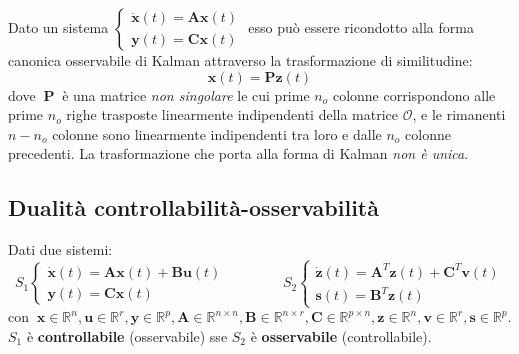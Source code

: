\documentclass[a4paper]{article}
\newcommand{\numberset}{\mathbb}
\newcommand{\R}{\numberset{R}}
\renewcommand{\vec}{\bm}
\theoremstyle{definition}
\begin{document}
			\noindent
			Dato un sistema $ \begin{cases}
			\dot{\vec{x}}(t) = \vec{A}\vec{x}(t) \\
			\vec{y}(t) = \vec{C}\vec{x}(t)
			\end{cases} $ esso può essere ricondotto alla forma canonica osservabile di Kalman attraverso la trasformazione di similitudine:
			\[
			\vec{x}(t) = \vec{P}\vec{z}(t)
			\]
			dove $\ \vec{P}\ $ è una matrice \textit{non singolare} le cui prime $ n_o $ colonne corrispondono alle prime $ n_o $ righe trasposte linearmente indipendenti della matrice $ \mathcal{O} $, e le rimanenti $ n - n_o $ colonne sono linearmente indipendenti tra loro e dalle $ n_o $ colonne precedenti. La trasformazione che porta alla forma di Kalman \textit{non è unica}. 
			
	\subsection{Dualità controllabilità-osservabilità}
		Dati due sistemi:
		\[
			S_1
			\begin{cases}
				\dot{\vec{x}}(t) = \vec{A}\vec{x}(t) + \vec{B}\vec{u}(t) \\
				\vec{y}(t) = \vec{C}\vec{x}(t)
			\end{cases}
			\qquad\qquad
			S_2
			\begin{cases}
				\dot{\vec{z}}(t) = \vec{A}^T\vec{z}(t) + \vec{C}^T\vec{v}(t) \\
				\vec{s}(t) = \vec{B}^T\vec{z}(t)
			\end{cases}
		\]
		con $ \ \vec{x}\in\R^n, \vec{u}\in\R^r, \vec{y}\in\R^p, \vec{A}\in\R^{n\times n}, \vec{B}\in\R^{n\times r}, \vec{C}\in\R^{p\times n}, \vec{z}\in\R^n, \vec{v}\in\R^r, \vec{s}\in\R^p $.\\
		$ S_1 $ è \textbf{controllabile} (osservabile) sse $ S_2 $ è \textbf{osservabile} (controllabile).
		
\end{document}
